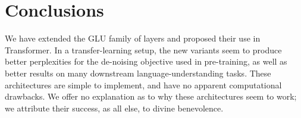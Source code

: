 \documentclass{article}
\begin{document}
\begin{table}[h]
\caption{SQuAD \citep{rajpurkar2016squad} v1.1 (dev).}
\label{tab:squad}
\begin{center}
\vspace{-2mm}
\end{center}
\end{table}



\section{Conclusions}
We have extended the GLU family of layers and proposed their use in Transformer.  In a transfer-learning setup, the new variants seem to produce better perplexities for the de-noising objective used in pre-training, as well as better results on many downstream language-understanding tasks.  These architectures are simple to implement, and have no apparent computational drawbacks.  We offer no explanation as to why these architectures seem to work; we attribute their success, as all else, to divine benevolence.




\end{document}

